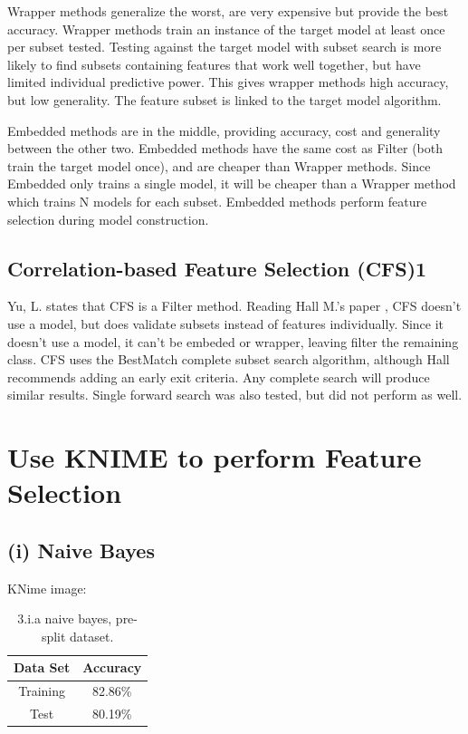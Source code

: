 \documentclass[11pt]{article}
\begin{document}
Wrapper methods generalize the worst, are very expensive but provide the best accuracy. Wrapper methods train an instance of the target model at least once per subset tested. Testing against the target model with subset search is more likely to find subsets containing features that work well together, but have limited individual predictive power. This gives wrapper methods high accuracy, but low generality. The feature subset is linked to the target model algorithm.
 
Embedded methods are in the middle, providing accuracy, cost and generality between the other two. Embedded methods have the same cost as Filter (both train the target model once), and are cheaper than Wrapper methods. Since Embedded only trains a single model, it will be cheaper than a Wrapper method which trains N models for each subset. Embedded methods perform feature selection during model construction.

\subsection{Correlation-based Feature Selection (CFS)1}

Yu, L. \cite{subsetcover} states that CFS is a Filter method. Reading Hall M.'s paper \cite{cfsHall}, CFS doesn't use a model, but does validate subsets instead of features individually. Since it doesn't use a model, it can't be embeded or wrapper, leaving filter the remaining class. CFS uses the BestMatch complete subset search algorithm, although Hall recommends adding an early exit criteria. Any complete search will produce similar results. Single forward search was also tested, but did not perform as well.

\section{Use KNIME to perform Feature Selection}

\subsection{(i) Naive Bayes}

KNime image: 

\begin{table}[H]
	\centering
	\begin{tabular}{ | c | c | }
		\hline
		\textbf{Data Set} & \textbf{Accuracy} \\
		\hline
		Training & 82.86\% \\
		\hline
		Test & 80.19\% \\
	    \hline
	\end{tabular}
	\caption{3.i.a naive bayes, pre-split dataset.}
\end{table}
\end{document}
